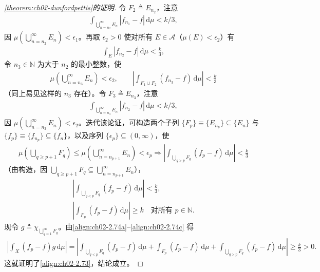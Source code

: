 \documentclass[../../main.tex]{subfiles}%
\begin{document}
\begin{proof}[\cref{theorem:ch02-dunfordpettis}的证明]
令 $F_2\triangleq E_{n_2}$，注意
\begin{align*}
\int_{\bigcup_{n=n_2}^\infty E_n}|f_{n_1}-f|\,\mathrm{d}\mu<k/3,
\end{align*}
因 $\mu(\bigcup_{n=n_2}^\infty E_n)<\epsilon_1$。再取 $\epsilon_2>0$ 使对所有 $E\in\mathscr A$（$\mu(E)<\epsilon_2$）有
\begin{align*}
\int_E|f_{n_2}-f|\,\mathrm{d}\mu<\frac k3,
\end{align*}
令 $n_3\in\mathbb N$ 为大于 $n_2$ 的最小整数，使
\begin{align*}
\mu\left(\bigcup_{n=n_3}^\infty E_n\right)<\epsilon_2,\qquad
\left|\int_{F_1\cup F_2}(f_{n_3}-f)\,\mathrm{d}\mu\right|<\frac k3
\end{align*}
（同上易见这样的 $n_3$ 存在）。令 $F_3\triangleq E_{n_3}$，注意
\begin{align*}
\int_{\bigcup_{n=n_3}^\infty E_n}|f_{n_2}-f|\,\mathrm{d}\mu<k/3,
\end{align*}
因 $\mu(\bigcup_{n=n_3}^\infty E_n)<\epsilon_2$。迭代该论证，可构造两个子列 $\{F_p\}\equiv\{E_{n_p}\}\subseteq\{E_n\}$ 与 $\{f_p\}\equiv\{f_{n_p}\}\subseteq\{f_n\}$，以及序列 $\{\epsilon_p\}\subseteq(0,\infty)$，使
\begin{align}
\mu\left(\bigcup_{q\geqslant p+1}F_q\right)\leqslant\mu\left(\bigcup_{n=n_{p+1}}^\infty E_n\right)<\epsilon_p
\Rightarrow\left|\int_{\bigcup_{q>p}F_q}(f_p-f)\,\mathrm{d}\mu\right|<\frac k3 \label{align:ch02-2.74a}
\end{align}
（由构造，因 $\bigcup_{q\geqslant p+1}F_q\subseteq\bigcup_{n=n_{p+1}}^\infty E_n$），
\begin{align}
\left|\int_{\bigcup_{q<p}F_q}(f_p-f)\,\mathrm{d}\mu\right|<\frac k3, \label{align:ch02-2.74b}\\
\left|\int_{F_p}(f_p-f)\,\mathrm{d}\mu\right|\geqslant k\quad\text{对所有 }p\in\mathbb N. \label{align:ch02-2.74c}
\end{align}
现令 $g\triangleq \chi_{\bigcup_{q=1}^\infty F_q}$。由\eqref{align:ch02-2.74a}--\eqref{align:ch02-2.74c} 得
\begin{align*}
\left|\int_X(f_p-f)g\,\mathrm{d}\mu\right|
=\left|\int_{\bigcup_{q<p}F_q}(f_p-f)\,\mathrm{d}\mu+\int_{F_p}(f_p-f)\,\mathrm{d}\mu+\int_{\bigcup_{q>p}F_q}(f_p-f)\,\mathrm{d}\mu\right|
\geqslant\frac k3>0.
\end{align*}
这就证明了\eqref{align:ch02-2.73}，结论成立。
\end{proof}
\end{document}
